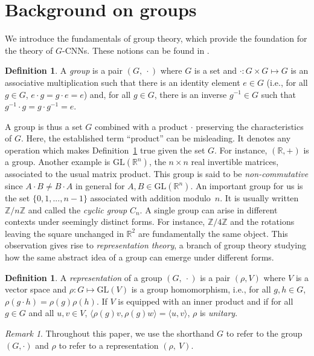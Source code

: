 \documentclass{article}
\theoremstyle{plain}
\theoremstyle{definition}
\newtheorem{definition}[theorem]{Definition}
\theoremstyle{remark}
\newtheorem{remark}[theorem]{Remark}
\begin{document}
\newpage
\appendix

\section{Background on groups}\label{app:group_theory}
We introduce the fundamentals of group theory, which provide the foundation for the theory of $G$-CNNs. These notions can be found in \citep{steinberg2011representation}.
\begin{definition}\label{def:group}
    A \emph{group} is a pair $(G,\ \cdot)$ where $G$ is a set and $\cdot:G\times G\mapsto G$ is an associative multiplication such that there is an identity element $e\in G$ (i.e., for all $g\in G$, $e\cdot g=g\cdot e=e$) and, for all $g\in G$, there is an inverse $g^{-1}\in G$ such that $g^{-1}\cdot g = g\cdot g^{-1}=e$.
\end{definition}
A group is thus a set $G$ combined with a product $\cdot$ preserving the characteristics of $G$. Here, the established term ``product'' can be misleading. It denotes any operation which makes Definition~\ref{def:group} true given the set $G$. For instance, $(\mathbb{R},+)$ is a group. Another example is $\mathrm{GL}(\mathbb{R}^n)$, the $n\times n$ real invertible matrices, associated to the usual matrix product. This group is said to be \emph{non-commutative} since $A\cdot B\neq B\cdot A$ in general for $A,B\in\mathrm{GL}(\mathbb{R}^n)$. An important group for us is the set $\{0,1,...,n-1\}$ associated with addition modulo~$n$. It is usually written $\mathbb{Z}/n\mathbb{Z}$ and called the \emph{cyclic group} $C_n$. A single group can arise in different contexts under seemingly distinct forms. For instance, $\mathbb{Z}/4\mathbb{Z}$ and the rotations leaving the square unchanged in $\mathbb{R}^2$ are fundamentally the same object. This observation gives rise to \emph{representation theory}, a branch of group theory studying how the same abstract idea of a group can emerge under different forms.
\begin{definition}\label{def:representation}
    A \emph{representation} of a group $(G,\ \cdot)$ is a pair $(\rho, V)$ where $V$ is a vector space and $\rho:G\mapsto \mathrm{GL}(V)$ is a group homomorphism, i.e., for all $g,h\in G$, $\rho(g\cdot h) = \rho(g)\rho(h)$. If $V$ is equipped with an inner product and if for all $g\in G$ and all $u,v\in V$,  $\langle\rho(g)v,\rho(g)w\rangle =\langle u, v\rangle$, $\rho$ is \emph{unitary}.
\end{definition}
\begin{remark}
    Throughout this paper, we use the shorthand $G$ to refer to the group $(G,\cdot )$ and $\rho$ to refer to a representation $(\rho,\ V)$.
\end{remark}
\end{document}
